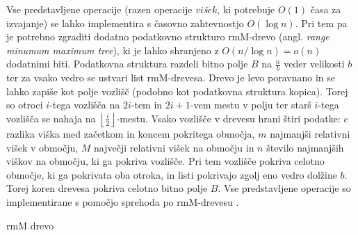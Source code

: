Vse predstavljene operacije (razen operacije $vi$\textit{š}$ek$, ki potrebuje $O(1)$ časa za izvajanje) se lahko implementira s časovno zahtevnostjo $O(\log{n})$. Pri tem pa je potrebno zgraditi dodatno podatkovno strukturo rmM-drevo (angl. \textit{range minumum maximum tree}), ki je lahko shranjeno z $O(n/\log{n})=o(n)$ dodatnimi biti. Podatkovna struktura razdeli bitno polje $B$ na $\frac{n}{b}$ veder velikosti $b$ ter za vsako vedro se ustvari list rmM-drevesa. Drevo je levo poravnano in se lahko zapiše kot polje vozlišč (podobno kot podatkovna struktura kopica). Torej so otroci $i$-tega vozlišča na $2i$-tem in $2i+1$-vem mestu v polju ter starš $i$-tega vozlišča se nahaja na $\left\lfloor\frac{i}{2}\right\rfloor$-mestu. Vsako vozlišče v drevesu hrani štiri podatke: $e$ razlika viška med začetkom in koncem pokritega območja, $m$ najmanjši relativni višek v območju, $M$ največji relativni višek na območju in $n$ število najmanjših viškov na območju, ki ga pokriva vozlišče. Pri tem vozlišče pokriva celotno območje, ki ga pokrivata oba otroka, in listi pokrivajo zgolj eno vedro dolžine $b$. Torej koren drevesa pokriva celotno bitno polje $B$. Vse predstavljene operacije so implementirane s pomočjo sprehoda po rmM-drevesu 
\cite{Navarro2016}.

rmM drevo